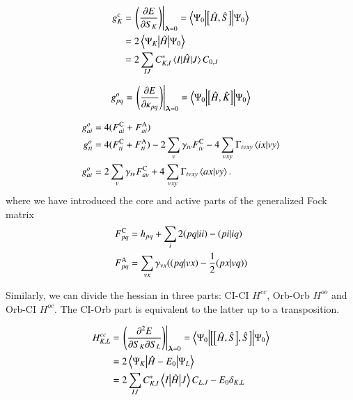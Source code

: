 \documentclass[aps,prb,reprint,showkeys,superscriptaddress]{revtex4-1}
\begin{document}
\begin{align}
  \label{eq:CASSCF_CI_Gradient}
  g^c_{K} &= \eval{\mleft(\pdv{E}{S_{K}}\mright)}_{\bm{\lambda}=0} = \mel**{\Psi_0}{\com{\hH}{\hS}}{\Psi_0} \\
          &= 2\mel**{\Psi_K}{\hH}{\Psi_0} \notag \\
          &= 2\sum_{IJ}C_{K,I}^*\mel{I}{\hH}{J}C_{0,J} \notag
\end{align}

\begin{equation}
  \label{eq:CASSCF_Orb_Gradient_general}
  g^o_{pq} = \eval{\mleft(\pdv{E}{\kappa_{pq}}\mright)}_{\bm{\lambda}=0} = \mel**{\Psi_0}{\com{\hH}{\hK}}{\Psi_0}
\end{equation}

\begin{subequations}
  \label{eq:CASSCF_Orb_Gradient}
  \begin{align}
    g^o_{ai} &= 4(F_{ai}^{\text{C}} + F_{ai}^{\text{A}}) \\
    g^o_{ti} &= 4(F_{ti}^{\text{C}} + F_{ti}^{\text{A}}) - 2\sum_v \gamma_{tv}F_{iv}^{\text{C}} -4\sum_{vxy}\Gamma_{tvxy}\braket{ix}{vy} \\
    g^o_{at} &= 2\sum_v \gamma_{tv}F_{av}^{\text{C}} + 4\sum_{vxy}\Gamma_{tvxy}\braket{ax}{vy}.
  \end{align}
\end{subequations}
where we have introduced the core and active parts of the generalized Fock matrix
\begin{align}
  \label{eq:CoreActGeneralizedFock}
  \FC{pq} &= h_{pq} + \sum_{i} 2\ceri{pq}{ii} - \ceri{pi}{iq} \\
  \FA{pq} &= \sum_{vx}\gamma_{vx}(\ceri{pq}{vx} - \frac{1}{2}\ceri{px}{vq})
\end{align}

Similarly, we can divide the hessian in three parts: CI-CI $H^{cc}$, Orb-Orb $H^{oo}$ and Orb-CI $H^{oc}$. The CI-Orb part is equivalent to the latter up to a transposition.

\begin{align}
  \label{eq:CASSCF_CICI_Hessian}
  H^{cc}_{K,L} &= \eval{\mleft(\pdv{E}{S_{K}}{S_{L}}\mright)}_{\bm{\lambda}=0} = \mel**{\Psi_0}{\com{\com{\hH}{\hS}}{\hS}}{\Psi_0} \\
  &= 2\mel**{\Psi_K}{\hH - E_0}{\Psi_L} \notag \\
  &= 2\sum_{IJ}C_{K,I}^*\mel**{I}{\hH}{J}C_{L,J} - E_0\delta_{K,L} \notag
\end{align}
\end{document}
